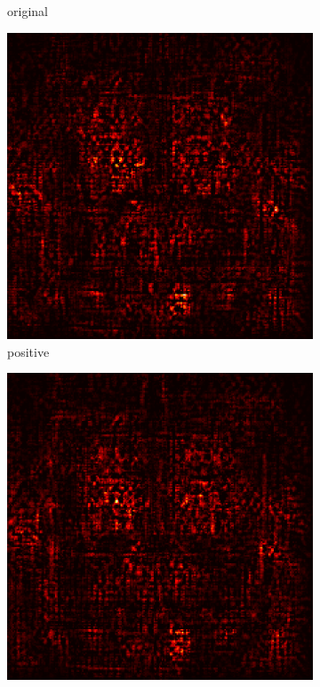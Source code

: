 \documentclass[preprint,12pt]{elsarticle}
\begin{document}
\begin{figure}
\begin{subfigure}{0.14\linewidth}
        \caption{original}
    \end{subfigure}
    \hfill
    \begin{subfigure}{0.14\textwidth}
        \centering
        \includegraphics[width=\linewidth]{../visualizations/examples/imagenette/resnet18/positive_saliency_map/9.png}
        \caption{positive}
    \end{subfigure}
    \hfill
    \begin{subfigure}{0.14\textwidth}
        \centering
        \includegraphics[width=\linewidth]{../visualizations/examples/imagenette/resnet18/negative_saliency_map/9.png}

\end{subfigure}
\end{figure}
\end{document}
